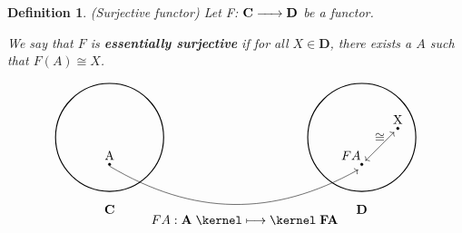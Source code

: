 \documentclass{article}
\newtheorem{definition}{Definition}[section]
\renewcommand{\to}{\xrightarrow{\hspace{0.5cm}}}  %
\renewcommand{\mapsto}{\mathrel{\kernel\longmapsto\kernel}}  %
\begin{document}
    \begin{definition}(Surjective functor)
        Let F: \(\mathbf{C} \to \mathbf{D}\) be a functor.

        We say that \(F\) is \textbf{essentially surjective} if for all \(X \in \mathbf{D}\), there exists a \(A\) such that \(F(A) \cong X\).

        \[
            \begin{tikzpicture}
                \draw[thick] (0,0) circle (1.5);  %
                \filldraw (0, -0.75) circle (1pt);  %
                \node at (0, -0.5) {A};  %
                \node at (0, -2) {$\mathbf{C}$};  %

                \draw[thick] (7,0) circle (1.5);  %
                \filldraw (8, 0.25) circle (1pt);  %
                \node at (8, 0.5) {X};  %
                \filldraw (7, -0.75) circle (1pt);  %
                \node at (6.7, -0.5) {$FA$};  %
                \node at (3.75, -2.3) {$FA: \mathbf{A} \mapsto \mathbf{FA}$};  %
                \node at (7, -2) {$\mathbf{D}$};  %

                \draw[->, bend right] (0, -0.8) to (6.9, -0.9);  %
                \draw[<->] (7.9, 0.15) -- (7.1, -0.65)
                node[midway, above] {$\cong$};  %
            \end{tikzpicture}
        \]


    \end{definition}

    \vspace{0.2in}

    \newpage
\end{document}

